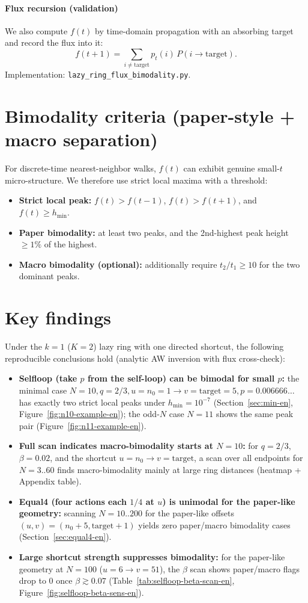 \documentclass[11pt]{article}
\begin{document}
\paragraph{Flux recursion (validation)}
We also compute $f(t)$ by time-domain propagation with an absorbing target and record the flux into it:
\[
f(t+1)=\sum_{i\neq \mathrm{target}} p_t(i)\,P(i\to \mathrm{target}).
\]
Implementation: \texttt{lazy\_ring\_flux\_bimodality.py}.

\section{Bimodality criteria (paper-style + macro separation)}\label{sec:criterion-en}
For discrete-time nearest-neighbor walks, $f(t)$ can exhibit genuine small-$t$ micro-structure.
We therefore use strict local maxima with a threshold:
\begin{itemize}
  \item \textbf{Strict local peak:} $f(t)>f(t-1)$, $f(t)>f(t+1)$, and $f(t)\ge h_{\min}$.
  \item \textbf{Paper bimodality:} at least two peaks, and the 2nd-highest peak height $\ge 1\%$ of the highest.
  \item \textbf{Macro bimodality (optional):} additionally require $t_2/t_1\ge 10$ for the two dominant peaks.
\end{itemize}

\section{Key findings}
Under the $k=1$ ($K=2$) lazy ring with one directed shortcut, the following reproducible conclusions hold (analytic AW inversion with flux cross-check):
\begin{itemize}
  \item \textbf{Selfloop (take $p$ from the self-loop) can be bimodal for small $p$:} the minimal case
  $N=10,q=2/3,u=n_0=1\to v=\mathrm{target}=5,p=0.006666\ldots$ has exactly two strict local peaks under $h_{\min}=10^{-7}$
  (Section~\ref{sec:min-en}, Figure~\ref{fig:n10-example-en}); the odd-$N$ case $N=11$ shows the same peak pair (Figure~\ref{fig:n11-example-en}).
  \item \textbf{Full scan indicates macro-bimodality starts at $N=10$:} for $q=2/3$, $\beta=0.02$, and the shortcut $u=n_0\to v=\mathrm{target}$,
  a scan over all endpoints for $N=3..60$ finds macro-bimodality mainly at large ring distances (heatmap + Appendix table).
  \item \textbf{Equal4 (four actions each $1/4$ at $u$) is unimodal for the paper-like geometry:} scanning $N=10..200$ for the paper-like offsets
  $(u,v)=(n_0+5,\mathrm{target}+1)$ yields zero paper/macro bimodality cases (Section~\ref{sec:equal4-en}).
  \item \textbf{Large shortcut strength suppresses bimodality:} for the paper-like geometry at $N=100$ ($u=6\to v=51$),
  the $\beta$ scan shows paper/macro flags drop to 0 once $\beta\gtrsim 0.07$ (Table~\ref{tab:selfloop-beta-scan-en}, Figure~\ref{fig:selfloop-beta-sens-en}).
\end{itemize}
\end{document}
